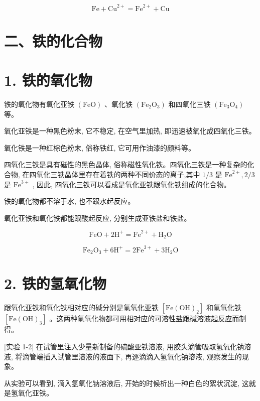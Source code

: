 \documentclass[10pt]{article}
\begin{document}
\[
\mathrm{{Fe}} + {\mathrm{{Cu}}}^{2 + } = {\mathrm{{Fe}}}^{2 + } + \mathrm{{Cu}}
\]

\section*{二、铁的化合物}

\section*{1. 铁的氧化物}

铁的氧化物有氧化亚铁 \(\left( \mathrm{{FeO}}\right)\) 、氧化铁 \(\left( {{\mathrm{{Fe}}}_{2}{\mathrm{O}}_{3}}\right)\) 和四氧化三铁 \(\left( {{\mathrm{{Fe}}}_{3}{\mathrm{O}}_{4}}\right)\) 等。

氧化亚铁是一种黑色粉末, 它不稳定, 在空气里加热, 即迅速被氧化成四氧化三铁。

氧化铁是一种红棕色粉末, 俗称铁红, 它可用作油漆的颜料等。

四氧化三铁是具有磁性的黑色晶体, 俗称磁性氧化铁。四氧化三铁是一种复杂的化合物, 在四氧化三铁晶体里存在着铁的两种不同价态的离子,其中 \(1/3\) 是 \({\mathrm{{Fe}}}^{2 + },2/3\) 是 \({\mathrm{{Fe}}}^{3 + }\) , 因此, 四氧化三铁可以看成是氧化亚铁跟氧化铁组成的化合物。

铁的氧化物都不溶于水, 也不跟水起反应。

氧化亚铁和氧化铁都能跟酸起反应, 分别生成亚铁盐和铁盐。

\[
\mathrm{{FeO}} + 2{\mathrm{H}}^{ + } = {\mathrm{{Fe}}}^{2 + } + {\mathrm{H}}_{2}\mathrm{O}
\]

\[
{\mathrm{{Fe}}}_{2}{\mathrm{O}}_{3} + 6{\mathrm{H}}^{ + } = 2{\mathrm{{Fe}}}^{3 + } + 3{\mathrm{H}}_{2}\mathrm{O}
\]

\section*{2. 铁的氢氧化物}

跟氧化亚铁和氧化铁相对应的碱分别是氢氧化亚铁 \(\left\lbrack {\mathrm{{Fe}}{\left( \mathrm{{OH}}\right) }_{2}}\right\rbrack\) 和氢氧化铁 \(\left\lbrack {\mathrm{{Fe}}{\left( \mathrm{{OH}}\right) }_{3}}\right\rbrack\) 。这两种氢氧化物都可用相对应的可溶性盐跟碱溶液起反应而制得。

[实验 1-2] 在试管里注入少量新制备的硫酸亚铁溶液, 用胶头滴管吸取氢氧化钠溶液, 将滴管端插入试管里溶液的液面下, 再逐滴滴入氢氧化钠溶液, 观察发生的现象。

从实验可以看到, 滴入氢氧化钠溶液后, 开始的时候析出一种白色的絮状沉淀, 这就是氢氧化亚铁。
\end{document}

